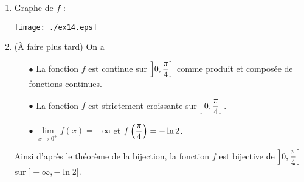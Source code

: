 \documentclass[a4paper, 11pt]{article}
\begin{document}
\begin{correction}
\begin{enumerate}
\noindent De plus, en \'etudiant des cas, on sait que $(\ln{|u|})^{\prime}=\ddp\frac{u^{\prime}}{u}$ si $u$ d\'erivable. Ainsi ici on obtient que: $f^{\prime}(x)=\ddp\frac{  \cos^2{x} - \sin^2{x}  }{\cos{x} \sin{x}}=\ddp\frac{\cos{(2x)}}{\cos{x} \sin{x}} $.\\
\noindent Sur $\left\rbrack 0,\ddp\frac{\pi}{4}\right\rbrack$, on a: $\cos{x}> 0$, $\sin{x}>0$ et $\cos{(2x)}\geq 0$ car $2x\in \left\rbrack 0,\ddp\frac{\pi}{2}\right\rbrack$. Ainsi on a: $f^{\prime}(x)\geq 0$ sur $\left\rbrack 0,\ddp\frac{\pi}{4}\right\rbrack$.
\begin{center}
\end{center}
En effet: $\lim\limits_{x\to 0^+} f(x)=-\infty$ par propri\'et\'es sur les produit et compos\'ees de limites. 
\item Graphe de $f$ :
\begin{center}
\texttt{[image: ./ex14.eps]} 
\end{center}
\item (\`A faire plus tard) On a
\begin{itemize}
\item[$\bullet$] La fonction $f$ est continue sur $\left\rbrack 0,\ddp\frac{\pi}{4}\right\rbrack$ comme produit et compos\'ee de fonctions continues.
\item[$\bullet$] La fonction $f$ est strictement croissante sur $\left\rbrack 0,\ddp\frac{\pi}{4}\right\rbrack$.
\item[$\bullet$] $\lim\limits_{x\to 0^+} f(x)=-\infty$ et $f\left(\displaystyle\frac{\pi}{4}\right)=-\ln{2}$.
\end{itemize}
Ainsi d'apr\`{e}s le th\'eor\`{e}me de la bijection, la fonction $f$ est bijective de $\left\rbrack 0,\ddp\frac{\pi}{4}\right\rbrack$ sur $\rbrack -\infty,-\ln{2}\rbrack$.
\end{enumerate}
\end{correction}

\end{document}
